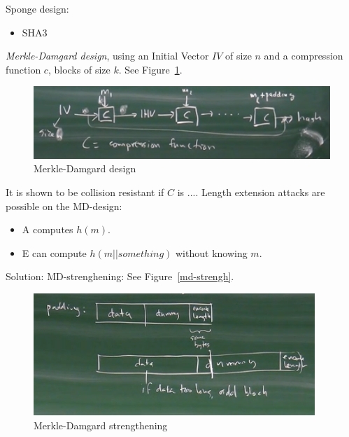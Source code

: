 \documentclass[language=english,number=]{homework}
\begin{document}
    Sponge design:
    \begin{itemize}
        \item SHA3
    \end{itemize}

    \textit{Merkle-Damgard design}, using an Initial Vector $IV$ of size $n$ and a compression function $c$, blocks of size $k$.
See Figure~\ref{md}.

\begin{figure}
    \centering
    \includegraphics[width=\textwidth]{merkle-damgard.PNG}
    \caption{Merkle-Damgard design}
    \label{md}
\end{figure}

    It is shown to be collision resistant if $C$ is ....
    Length extension attacks are possible on the MD-design:
    \begin{itemize}
        \item A computes $h(m)$.
        \item E can compute $h(m||something)$ without knowing $m$.
    \end{itemize}

    Solution: MD-strenghening:
    See Figure~\ref{md-strengh}.

\begin{figure}
    \centering
    \includegraphics[width=\textwidth]{md-strength.PNG}
    \caption{Merkle-Damgard strengthening}
    \label{md-strength}
\end{figure}
\end{document}
